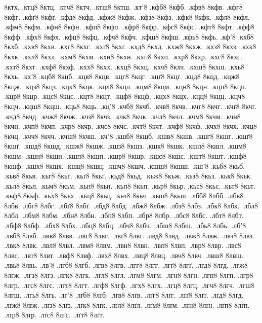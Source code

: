 {8ктх.
.ктц8
8ктц.
.ктч8
8ктч.
.ктш8
8ктш.
.кт'8
.кфб8
8кфб.
.кфв8
8кфв.
.кфг8
8кфг.
.кфґ8
8кфґ.
.кфд8
8кфд.
.кфж8
8кфж.
.кфз8
8кфз.
.кфк8
8кфк.
.кфл8
8кфл.
.кфм8
8кфм.
.кфн8
8кфн.
.кфп8
8кфп.
.кфр8
8кфр.
.кфс8
8кфс.
.кфт8
8кфт.
.кфф8
8кфф.
.кфх8
8кфх.
.кфц8
8кфц.
.кфч8
8кфч.
.кфш8
8кфш.
.кфь8
8кфь.
.кф'8
.кхб8
8кхб.
.кхв8
8кхв.
.кхг8
8кхг.
.кхґ8
8кхґ.
.кхд8
8кхд.
.кхж8
8кхж.
.кхз8
8кхз.
.кхк8
8кхк.
.кхл8
8кхл.
.кхм8
8кхм.
.кхн8
8кхн.
.кхп8
8кхп.
.кхр8
8кхр.
.кхс8
8кхс.
.кхт8
8кхт.
.кхф8
8кхф.
.кхх8
8кхх.
.кхц8
8кхц.
.кхч8
8кхч.
.кхш8
8кхш.
.кхь8
8кхь.
.кх'8
.кцб8
8кцб.
.кцв8
8кцв.
.кцг8
8кцг.
.кцґ8
8кцґ.
.кцд8
8кцд.
.кцж8
8кцж.
.кцз8
8кцз.
.кцк8
8кцк.
.кцл8
8кцл.
.кцм8
8кцм.
.кцн8
8кцн.
.кцп8
8кцп.
.кцр8
8кцр.
.кцс8
8кцс.
.кцт8
8кцт.
.кцф8
8кцф.
.кцх8
8кцх.
.кцц8
8кцц.
.кцч8
8кцч.
.кцш8
8кцш.
.кць8
8кць.
.кц'8
.кчб8
8кчб.
.кчв8
8кчв.
.кчг8
8кчг.
.кчґ8
8кчґ.
.кчд8
8кчд.
.кчж8
8кчж.
.кчз8
8кчз.
.кчк8
8кчк.
.кчл8
8кчл.
.кчм8
8кчм.
.кчн8
8кчн.
.кчп8
8кчп.
.кчр8
8кчр.
.кчс8
8кчс.
.кчт8
8кчт.
.кчф8
8кчф.
.кчх8
8кчх.
.кчц8
8кчц.
.кчч8
8кчч.
.кчш8
8кчш.
.кч'8
.кшб8
8кшб.
.кшв8
8кшв.
.кшг8
8кшг.
.кшґ8
8кшґ.
.кшд8
8кшд.
.кшж8
8кшж.
.кшз8
8кшз.
.кшк8
8кшк.
.кшл8
8кшл.
.кшм8
8кшм.
.кшн8
8кшн.
.кшп8
8кшп.
.кшр8
8кшр.
.кшс8
8кшс.
.кшт8
8кшт.
.кшф8
8кшф.
.кшх8
8кшх.
.кшц8
8кшц.
.кшч8
8кшч.
.кшш8
8кшш.
.кш'8
.кьб8
8кьб.
.кьв8
8кьв.
.кьг8
8кьг.
.кьґ8
8кьґ.
.кьд8
8кьд.
.кьж8
8кьж.
.кьз8
8кьз.
.кьк8
8кьк.
.кьл8
8кьл.
.кьм8
8кьм.
.кьн8
8кьн.
.кьп8
8кьп.
.кьр8
8кьр.
.кьс8
8кьс.
.кьт8
8кьт.
.кьф8
8кьф.
.кьх8
8кьх.
.кьц8
8кьц.
.кьч8
8кьч.
.кьш8
8кьш.
.лбб8
8лбб.
.лбв8
8лбв.
.лбг8
8лбг.
.лбґ8
8лбґ.
.лбд8
8лбд.
.лбж8
8лбж.
.лбз8
8лбз.
.лбк8
8лбк.
.лбл8
8лбл.
.лбм8
8лбм.
.лбн8
8лбн.
.лбп8
8лбп.
.лбр8
8лбр.
.лбс8
8лбс.
.лбт8
8лбт.
.лбф8
8лбф.
.лбх8
8лбх.
.лбц8
8лбц.
.лбч8
8лбч.
.лбш8
8лбш.
.лбь8
8лбь.
.лб'8
.лвб8
8лвб.
.лвв8
8лвв.
.лвг8
8лвг.
.лвґ8
8лвґ.
.лвд8
8лвд.
.лвж8
8лвж.
.лвз8
8лвз.
.лвк8
8лвк.
.лвл8
8лвл.
.лвм8
8лвм.
.лвн8
8лвн.
.лвп8
8лвп.
.лвр8
8лвр.
.лвс8
8лвс.
.лвт8
8лвт.
.лвф8
8лвф.
.лвх8
8лвх.
.лвц8
8лвц.
.лвч8
8лвч.
.лвш8
8лвш.
.лвь8
8лвь.
.лв'8
.лгб8
8лгб.
.лгв8
8лгв.
.лгг8
8лгг.
.лгґ8
8лгґ.
.лгд8
8лгд.
.лгж8
8лгж.
.лгз8
8лгз.
.лгк8
8лгк.
.лгл8
8лгл.
.лгм8
8лгм.
.лгн8
8лгн.
.лгп8
8лгп.
.лгр8
8лгр.
.лгс8
8лгс.
.лгт8
8лгт.
.лгф8
8лгф.
.лгх8
8лгх.
.лгц8
8лгц.
.лгч8
8лгч.
.лгш8
8лгш.
.лгь8
8лгь.
.лг'8
.лґб8
8лґб.
.лґв8
8лґв.
.лґг8
8лґг.
.лґґ8
8лґґ.
.лґд8
8лґд.
.лґж8
8лґж.
.лґз8
8лґз.
.лґк8
8лґк.
.лґл8
8лґл.
.лґм8
8лґм.
.лґн8
8лґн.
.лґп8
8лґп.
.лґр8
8лґр.
.лґс8
8лґс.
.лґт8
8лґт.
}
